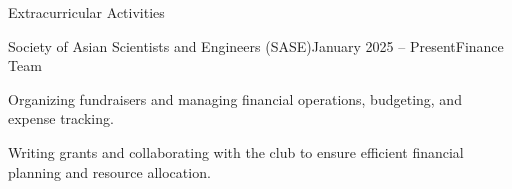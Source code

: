 \documentclass[
	a4paper, %
	9pt, %
]{resume} %
\begin{document}
\begin{rSection}{Extracurricular Activities}
\begin{rSubsection}{Society of Asian Scientists and Engineers (SASE)}{January 2025 -- Present}{Finance Team}{}
	\item Organizing fundraisers and managing financial operations, budgeting, and expense tracking.
    \item Writing grants and collaborating with the club to ensure efficient financial planning and resource allocation.
    \end{rSubsection}


\end{rSection}






\end{document}
